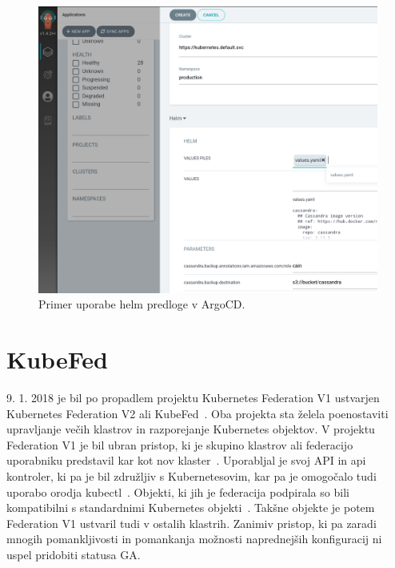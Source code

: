 \documentclass[a4paper, 12pt]{book}
\begin{document}
\begin{figure}[h]
\begin{center}
\includegraphics[width=1.0\textwidth]{images/primer-uporabe-helm-predloge-argo-cd.png}
\end{center}
\caption{Primer uporabe helm predloge v ArgoCD.}
\label{primer-uporabe-helm-predloge-argo-cd}
\end{figure}


\section{KubeFed}
9. 1. 2018 je bil po propadlem projektu Kubernetes Federation V1 ustvarjen Kubernetes Federation V2 ali KubeFed~\cite{Kubernetes-federation-evolution}.
Oba projekta sta želela poenostaviti upravljanje večih klastrov in razporejanje Kubernetes objektov.
V projektu Federation V1 je bil ubran pristop, ki je skupino klastrov ali federacijo uporabniku predstavil kar kot nov klaster~\cite{setup-cluster-federation-kubefed-v1}.
Uporabljal je svoj API in api kontroler, ki pa je bil združljiv s Kubernetesovim, kar pa je omogočalo tudi uporabo orodja kubectl~\cite{cluster-federation-in-Kubernetes-1.5}.
Objekti, ki jih je federacija podpirala so bili kompatibilni s standardnimi Kubernetes objekti~\cite{federated-cluster-kubefed-v1}.
Takšne objekte je potem Federation V1 ustvaril tudi v ostalih klastrih.
Zanimiv pristop, ki pa zaradi mnogih pomankljivosti in pomankanja možnosti naprednejših konfiguracij ni uspel pridobiti statusa GA.
\end{document}

